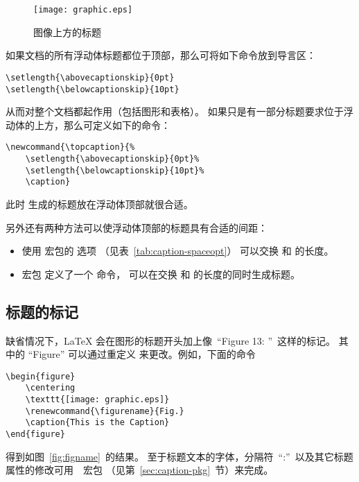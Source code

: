 \begin{figure} 
	\setlength{\abovecaptionskip}{0pt} 
	\setlength{\belowcaptionskip}{10pt} 
	\centering 
	\caption{图像上方的标题}\label{fig:normalabovefig}
	\texttt{[image: graphic.eps]} 
\end{figure}

如果文档的所有浮动体标题都位于顶部，那么可将如下命令放到导言区：
\begin{lstlisting}
\setlength{\abovecaptionskip}{0pt}
\setlength{\belowcaptionskip}{10pt}
\end{lstlisting}
从而对整个文档都起作用（包括图形和表格）。
如果只是有一部分标题要求位于浮动体的上方，那么可定义如下的命令：
\begin{lstlisting}
\newcommand{\topcaption}{% 
	\setlength{\abovecaptionskip}{0pt}% 
	\setlength{\belowcaptionskip}{10pt}% 
	\caption}
\end{lstlisting}
此时  生成的标题放在浮动体顶部就很合适。

另外还有两种方法可以使浮动体顶部的标题具有合适的间距：
\begin{itemize}
	\item 使用  宏包的  选项
	（见表~\ref{tab:caption-spaceopt}）
	可以交换  和  的长度。
	
	\item {} 宏包 \cite{topcapt-doc} 定义了一个  命令，
	可以在交换   和  的长度的同时生成标题。
\end{itemize}

\subsection{标题的标记}\label{ssec:captionlabel}

缺省情况下，\LaTeX{} 会在图形的标题开头加上像~``Figure 13: ''~这样的标记。
其中的 ``Figure'' 可以通过重定义  来更改。例如，下面的命令
\begin{lstlisting}
\begin{figure} 
	\centering 
	\texttt{[image: graphic.eps]} 
	\renewcommand{\figurename}{Fig.} 
	\caption{This is the Caption} 
\end{figure}
\end{lstlisting}
得到如图~\ref{fig:figname}~的结果。
至于标题文本的字体，分隔符~``:''~以及其它标题属性的修改可用~~宏包
（见第~\ref{sec:caption-pkg}~节）来完成。

